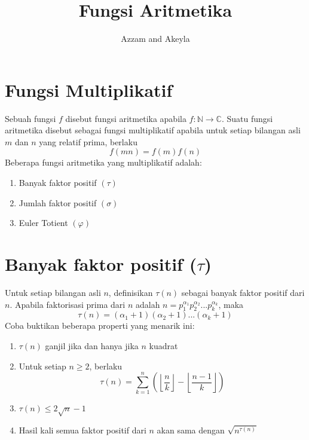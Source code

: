 \documentclass[11pt]{scrartcl}
\title{Fungsi Aritmetika}
\author{Azzam and Akeyla}
\begin{document}
\maketitle

\renewcommand*\contentsname{Daftar Isi}
\tableofcontents

\newpage
\section{Fungsi Multiplikatif}
Sebuah fungsi $f$ disebut fungsi aritmetika apabila $f: \mathbb{N} \rightarrow \mathbb{C}$. Suatu fungsi aritmetika disebut sebagai fungsi multiplikatif apabila untuk setiap bilangan asli $m$ dan $n$ yang relatif prima, berlaku \[f(mn) = f(m)f(n)\]
Beberapa fungsi aritmetika yang multiplikatif adalah:
\begin{enumerate}
    \item Banyak faktor positif $(\tau)$
    \item Jumlah faktor positif $(\sigma)$
    \item Euler Totient $(\varphi)$
\end{enumerate}
\section{Banyak faktor positif ($\tau$)}
Untuk setiap bilangan asli $n$, definisikan $\tau(n)$ sebagai banyak faktor positif dari $n$. Apabila faktorisasi prima dari $n$ adalah $n = p_1^{\alpha_1}p_2^{\alpha_2}...p_k^{\alpha_k}$, maka \[\tau(n) = (\alpha_1 + 1)(\alpha_2 + 1)...(\alpha_k + 1)\]
Coba buktikan beberapa properti yang menarik ini:
\begin{enumerate}
    \item $\tau(n)$ ganjil jika dan hanya jika $n$ kuadrat
    \item Untuk setiap $n \geq 2$, berlaku \[\tau(n) = \sum_{k = 1}^n \left(\left\lfloor \dfrac{n}{k}\right\rfloor - \left\lfloor \dfrac{n - 1}{k}\right\rfloor\right)\]
    \item $\tau(n) \leq 2\sqrt{n} - 1$
    \item Hasil kali semua faktor positif dari $n$ akan sama dengan $\sqrt{n^{\tau(n)}}$
\end{enumerate}
\end{document}

